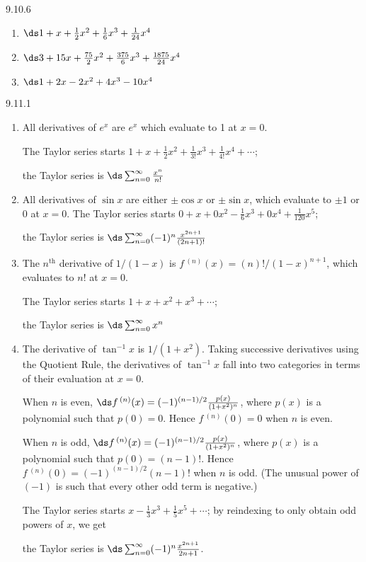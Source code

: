 \begin{Answer}{9.10.6}
\begin{enumerate}
\item
{$\ds 1+x+\frac12x^2+\frac16x^3+\frac1{24}x^4$
}
\item
{$\ds 3+15x+\frac{75}{2}x^2+\frac{375}{6}x^3+\frac{1875}{24}x^4$
}
\item
{$\ds 1+2x-2x^2+4x^3-10x^4$
}

\end{enumerate}
\end{Answer}
\begin{Answer}{9.11.1}
\begin{enumerate}
\item
{All derivatives of $e^x$ are $e^x$ which evaluate to 1 at $x=0$.

The Taylor series starts $1+x+\frac12x^2+\frac{1}{3!}x^3+\frac{1}{4!}x^4+\cdots$;

the Taylor series is $\ds \sum_{n=0}^\infty \frac{x^n}{n!}$
}
\item
{All derivatives of $\sin x$ are either $\pm\cos x$ or $\pm \sin x$, which evaluate to $\pm 1$ or $0$ at $x=0$. The Taylor series starts $0+x+0x^2-\frac16x^3+0x^4+\frac1{120}x^5$;

the Taylor series is $\ds \sum_{n=0}^\infty (-1)^n\frac{x^{2n+1}}{(2n+1)!}$
}
\item
{The $n^\text{th}$ derivative of $1/(1-x)$ is $f\,^{(n)}(x) = (n)!/(1-x)^{n+1}$, which evaluates to $n!$ at $x=0$.

The Taylor series starts $1+x+x^2+x^3+\cdots$;

the Taylor series is $\ds \sum_{n=0}^\infty x^n$
}
\item
{The derivative of $\tan^{-1}x$ is $1/(1+x^2)$. Taking successive derivatives using the Quotient Rule, the derivatives of $\tan^{-1}x$ fall into two categories in terms of their evaluation at $x=0$.

When $n$ is even, $\ds f\,^{(n)}(x) = (-1)^{(n-1)/2}\frac{p(x)}{(1+x^2)^n}$, where $p(x)$ is a polynomial such that $p(0) = 0$. Hence $f\,^{(n)}(0) = 0$ when $n$ is even.

When $n$ is odd, $\ds f\,^{(n)}(x) = (-1)^{(n-1)/2}\frac{p(x)}{(1+x^2)^n}$, where $p(x)$ is a polynomial such that $p(0) = (n-1)!$. Hence $f\,^{(n)}(0) = (-1)^{(n-1)/2}(n-1)!$ when $n$ is odd. (The unusual power of $(-1)$ is such that every other odd term is negative.)

The Taylor series starts $x-\frac13x^3+\frac15x^5+\cdots$; by reindexing to only obtain odd powers of $x$, we get

the Taylor series is $\ds \sum_{n=0}^\infty (-1)^n\frac{x^{2n+1}}{2n+1}$.
}
\end{enumerate}
\end{Answer}

